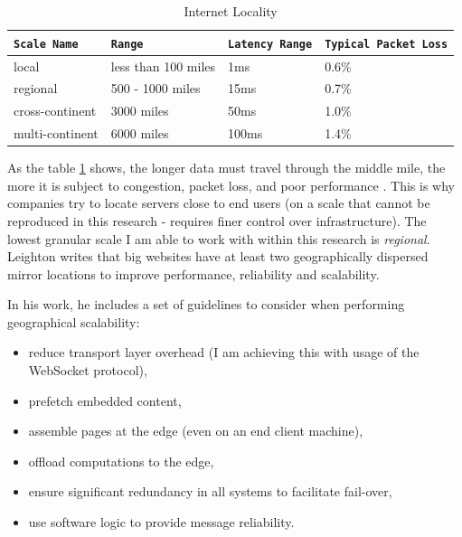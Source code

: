 \documentclass{uvamscse}
\begin{document}
\begin{table}[H]
\begin{center}
\begin{tabular}{llll}
  \texttt{Scale Name}       & \texttt{Range}        & \texttt{Latency Range}  & \texttt{Typical Packet Loss}\\
  \hline
  local                     & less than 100 miles   & 1ms                     & 0.6\% \\
  regional                  & 500 - 1000 miles      & 15ms                    & 0.7\% \\
  cross-continent           & 3000 miles            & 50ms                    & 1.0\% \\
  multi-continent           & 6000 miles            & 100ms                   & 1.4\% \\
\end{tabular}
\end{center}
\caption{Internet Locality}
\label{table:internetLocality}
\end{table}
As the table \ref{table:internetLocality} shows, the longer data must travel through the middle mile, the more it is subject to congestion, packet loss, and poor performance \cite{Akamai}. This is why companies try to locate servers close to end users (on a scale that cannot be reproduced in this research - requires finer control over infrastructure). The lowest granular scale I am able to work with within this research is \textit{regional}. Leighton writes that big websites have at least two geographically dispersed mirror locations to improve performance, reliability and scalability.

In his work, he includes a set of guidelines to consider when performing geographical scalability:
\begin{itemize}
  \item reduce transport layer overhead (I am achieving this with usage of the WebSocket protocol),
  \item prefetch embedded content,
  \item assemble pages at the edge (even on an end client machine),
  \item offload computations to the edge,
  \item ensure significant redundancy in all systems to facilitate fail-over,
  \item use software logic to provide message reliability.
\end{itemize}
\end{document}

